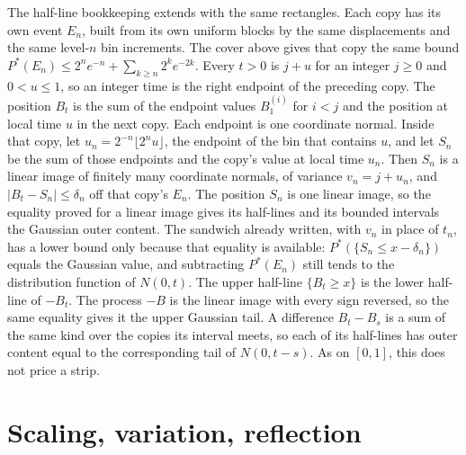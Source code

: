 The half-line bookkeeping extends with the same rectangles. Each copy has its own event $E_n$, built from its own uniform blocks by the same displacements and the same level-$n$ bin increments. The cover above gives that copy the same bound $P^*(E_n)\le 2^n e^{-n}+\sum_{k\ge n}2^k e^{-2k}$. Every $t>0$ is $j+u$ for an integer $j\ge 0$ and $0<u\le 1$, so an integer time is the right endpoint of the preceding copy. The position $B_t$ is the sum of the endpoint values $B^{(i)}_1$ for $i<j$ and the position at local time $u$ in the next copy. Each endpoint is one coordinate normal. Inside that copy, let $u_n=2^{-n}\lfloor 2^n u\rfloor$, the endpoint of the bin that contains $u$, and let $S_n$ be the sum of those endpoints and the copy's value at local time $u_n$. Then $S_n$ is a linear image of finitely many coordinate normals, of variance $v_n=j+u_n$, and $|B_t-S_n|\le\delta_n$ off that copy's $E_n$. The position $S_n$ is one linear image, so the equality proved for a linear image gives its half-lines and its bounded intervals the Gaussian outer content. The sandwich already written, with $v_n$ in place of $t_n$, has a lower bound only because that equality is available: $P^*(\{S_n\le x-\delta_n\})$ equals the Gaussian value, and subtracting $P^*(E_n)$ still tends to the distribution function of $N(0,t)$. The upper half-line $\{B_t\ge x\}$ is the lower half-line of $-B_t$. The process $-B$ is the linear image with every sign reversed, so the same equality gives it the upper Gaussian tail. A difference $B_t-B_s$ is a sum of the same kind over the copies its interval meets, so each of its half-lines has outer content equal to the corresponding tail of $N(0,t-s)$. As on $[0,1]$, this does not price a strip.

\section{Scaling, variation, reflection}




